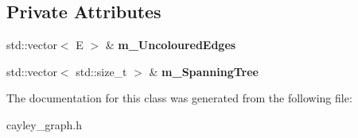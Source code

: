 \subsection*{Private Attributes}
\begin{DoxyCompactItemize}
\item 
\hypertarget{classcCayleyGrf_1_1cColourEdgesVis_a7735ee430b94a00ab35184dd72abdcd1}{std\-::vector$<$ E $>$ \& {\bfseries m\-\_\-\-Uncoloured\-Edges}}\label{classcCayleyGrf_1_1cColourEdgesVis_a7735ee430b94a00ab35184dd72abdcd1}

\item 
\hypertarget{classcCayleyGrf_1_1cColourEdgesVis_ae82002348dbe1cac03fadf4f2e6d8341}{std\-::vector$<$ std\-::size\-\_\-t $>$ \& {\bfseries m\-\_\-\-Spanning\-Tree}}\label{classcCayleyGrf_1_1cColourEdgesVis_ae82002348dbe1cac03fadf4f2e6d8341}

\end{DoxyCompactItemize}


The documentation for this class was generated from the following file\-:\begin{DoxyCompactItemize}
\item 
cayley\-\_\-graph.\-h\end{DoxyCompactItemize}
